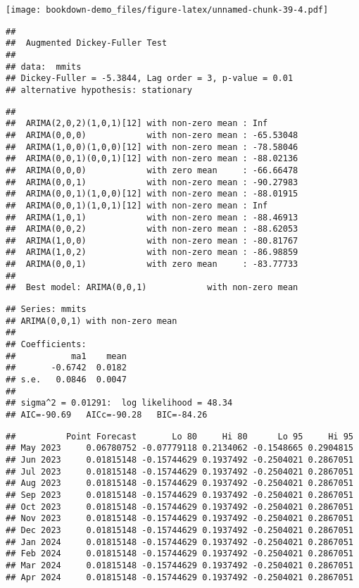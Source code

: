 \documentclass[
]{book}
\begin{document}
\texttt{[image: bookdown-demo\_files/figure-latex/unnamed-chunk-39-4.pdf]}

\begin{verbatim}
## 
##  Augmented Dickey-Fuller Test
## 
## data:  mmits
## Dickey-Fuller = -5.3844, Lag order = 3, p-value = 0.01
## alternative hypothesis: stationary
\end{verbatim}

\begin{verbatim}
## 
##  ARIMA(2,0,2)(1,0,1)[12] with non-zero mean : Inf
##  ARIMA(0,0,0)            with non-zero mean : -65.53048
##  ARIMA(1,0,0)(1,0,0)[12] with non-zero mean : -78.58046
##  ARIMA(0,0,1)(0,0,1)[12] with non-zero mean : -88.02136
##  ARIMA(0,0,0)            with zero mean     : -66.66478
##  ARIMA(0,0,1)            with non-zero mean : -90.27983
##  ARIMA(0,0,1)(1,0,0)[12] with non-zero mean : -88.01915
##  ARIMA(0,0,1)(1,0,1)[12] with non-zero mean : Inf
##  ARIMA(1,0,1)            with non-zero mean : -88.46913
##  ARIMA(0,0,2)            with non-zero mean : -88.62053
##  ARIMA(1,0,0)            with non-zero mean : -80.81767
##  ARIMA(1,0,2)            with non-zero mean : -86.98859
##  ARIMA(0,0,1)            with zero mean     : -83.77733
## 
##  Best model: ARIMA(0,0,1)            with non-zero mean
\end{verbatim}

\begin{verbatim}
## Series: mmits 
## ARIMA(0,0,1) with non-zero mean 
## 
## Coefficients:
##           ma1    mean
##       -0.6742  0.0182
## s.e.   0.0846  0.0047
## 
## sigma^2 = 0.01291:  log likelihood = 48.34
## AIC=-90.69   AICc=-90.28   BIC=-84.26
\end{verbatim}

\begin{verbatim}
##          Point Forecast       Lo 80     Hi 80      Lo 95     Hi 95
## May 2023     0.06780752 -0.07779118 0.2134062 -0.1548665 0.2904815
## Jun 2023     0.01815148 -0.15744629 0.1937492 -0.2504021 0.2867051
## Jul 2023     0.01815148 -0.15744629 0.1937492 -0.2504021 0.2867051
## Aug 2023     0.01815148 -0.15744629 0.1937492 -0.2504021 0.2867051
## Sep 2023     0.01815148 -0.15744629 0.1937492 -0.2504021 0.2867051
## Oct 2023     0.01815148 -0.15744629 0.1937492 -0.2504021 0.2867051
## Nov 2023     0.01815148 -0.15744629 0.1937492 -0.2504021 0.2867051
## Dec 2023     0.01815148 -0.15744629 0.1937492 -0.2504021 0.2867051
## Jan 2024     0.01815148 -0.15744629 0.1937492 -0.2504021 0.2867051
## Feb 2024     0.01815148 -0.15744629 0.1937492 -0.2504021 0.2867051
## Mar 2024     0.01815148 -0.15744629 0.1937492 -0.2504021 0.2867051
## Apr 2024     0.01815148 -0.15744629 0.1937492 -0.2504021 0.2867051
\end{verbatim}
\end{document}
